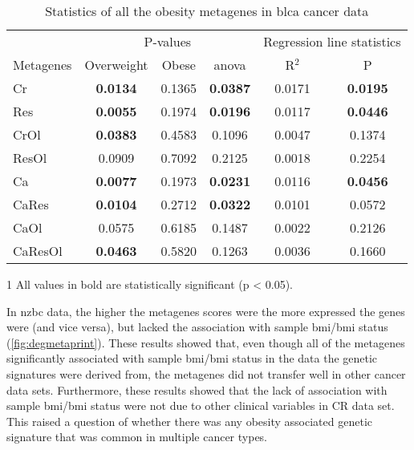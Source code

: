 \begin{table}[htpb]
	\centering
	\caption{Statistics of all the obesity metagenes in \gls{blca} cancer data}
	\label{tab:degmetablca}
	\begin{threeparttable}
		\begin{tabular}{lccccc}
			& \multicolumn{3}{c}{ P-values} & \multicolumn{2}{c}{ Regression line statistics}\\
			\cmidrule(r){2-4} \cmidrule(r){5-6}
			 Metagenes &  Overweight &  Obese &  \gls{anova} &  R$^2$ &  P \\
			\hline
			\hline
			\rule{0pt}{2.25ex}Cr & {\bfseries 0.0134}\tnote{1} & 0.1365 & {\bfseries 0.0387} & 0.0171 & {\bfseries 0.0195} \\
			Res                  & {\bfseries 0.0055}          & 0.1974 & {\bfseries 0.0196} & 0.0117 & {\bfseries 0.0446} \\
			CrOl                 & {\bfseries 0.0383}          & 0.4583 & 0.1096             & 0.0047 & 0.1374             \\
			ResOl                & 0.0909                      & 0.7092 & 0.2125             & 0.0018 & 0.2254             \\
			Ca                   & {\bfseries 0.0077}          & 0.1973 & {\bfseries 0.0231} & 0.0116 & {\bfseries 0.0456} \\
			CaRes                & {\bfseries 0.0104}          & 0.2712 & {\bfseries 0.0322} & 0.0101 & 0.0572             \\
			CaOl                 & 0.0575                      & 0.6185 & 0.1487             & 0.0022 & 0.2126             \\
			CaResOl              & {\bfseries 0.0463}          & 0.5820 & 0.1263             & 0.0036 & 0.1660             \\
			\hline
			\hline
		\end{tabular}
		\begin{tablenotes}
			\item [1] All values in bold are statistically significant (p \textless{} 0.05).
		\end{tablenotes}
	\end{threeparttable}
\end{table}

In \gls{nzbc} data, the higher the metagenes scores were the more expressed the genes were (and vice versa), but lacked the association with sample \gls{bmi}/\gls{bmi} status (\cref{fig:degmetaprint}).
These results showed that, even though all of the metagenes significantly associated with sample \gls{bmi}/\gls{bmi} status in the data the genetic signatures were derived from, the metagenes did not transfer well in other cancer data sets.
Furthermore, these results showed that the lack of association with sample \gls{bmi}/\gls{bmi} status were not due to other clinical variables in CR data set.
This raised a question of whether there was any obesity associated genetic signature that was common in multiple cancer types.


